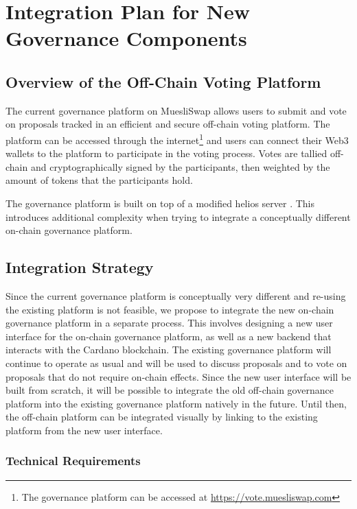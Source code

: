 \documentclass[11pt]{article}
\begin{document}
\section{Integration Plan for New Governance Components}
\subsection{Overview of the Off-Chain Voting Platform}

The current governance platform on MuesliSwap allows users to submit and vote on proposals tracked in an efficient and secure off-chain voting platform.
The platform can be accessed through the internet\footnote{The governance platform can be accessed at \url{https://vote.muesliswap.com}} and users can connect
their Web3 wallets to the platform to participate in the voting process.
Votes are tallied off-chain and cryptographically signed by the participants, then weighted by the amount of tokens that the participants hold.

The governance platform is built on top of a modified helios server \cite{DBLP:conf/uss/Adida08}.
This introduces additional complexity when trying to integrate a conceptually different on-chain governance platform.

\subsection{Integration Strategy}

Since the current governance platform is conceptually very different and re-using the existing platform is not feasible,
we propose to integrate the new on-chain governance platform in a separate process.
This involves designing a new user interface for the on-chain governance platform,
as well as a new backend that interacts with the Cardano blockchain.
The existing governance platform will continue to operate as usual and will be used to discuss proposals and to vote on proposals that do not require on-chain effects.
Since the new user interface will be built from scratch, it will be possible to integrate the old off-chain governance platform into the existing governance platform natively in the future.
Until then, the off-chain platform can be integrated visually by linking to the existing platform from the new user interface.

\subsubsection{Technical Requirements}
\end{document}
